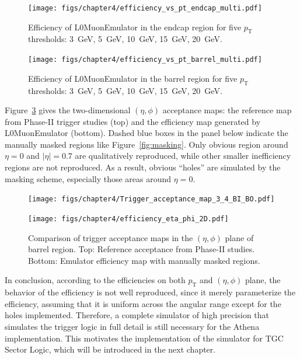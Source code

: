 \begin{figure}[htbp]
  \centering
  \texttt{[image: figs/chapter4/efficiency\_vs\_pt\_endcap\_multi.pdf]}
  \caption{Efficiency of L0MuonEmulator in the endcap region for five $p_\mathrm{T}$ thresholds: 3~GeV, 5~GeV, 10~GeV, 15~GeV, 20~GeV.}
  \label{fig:eff_pt_endcap}
\end{figure}

\begin{figure}[htbp]
  \centering
  \texttt{[image: figs/chapter4/efficiency\_vs\_pt\_barrel\_multi.pdf]}
  \caption{Efficiency of L0MuonEmulator in the barrel region for five $p_\mathrm{T}$ thresholds: 3~GeV, 5~GeV, 10~GeV, 15~GeV, 20~GeV.}
  \label{fig:eff_pt_barrel}
\end{figure}

Figure~\ref{fig:eta_phi_comparison} gives the two-dimensional $(\eta, \phi)$ acceptance maps: the reference map from Phase-II trigger studies (top) and the efficiency map generated by L0MuonEmulator (bottom). Dashed blue boxes in the panel below indicate the manually masked regions like Figure~\ref{fig:masking}. Only obvious region around $\eta = 0$ and $|\eta| = 0.7$ are qualitatively reproduced, while other smaller inefficiency regions are not reproduced. As a result, obvious ``holes'' are simulated by the masking scheme, especially those areas around $\eta = 0$.

\begin{figure}[htbp]
  \centering
  \texttt{[image: figs/chapter4/Trigger\_acceptance\_map\_3\_4\_BI\_BO.pdf]}
  \vspace{0.5em}
  
  \texttt{[image: figs/chapter4/efficiency\_eta\_phi\_2D.pdf]}
  
  \caption{Comparison of trigger acceptance maps in the $(\eta, \phi)$ plane of barrel region. Top: Reference acceptance from Phase-II studies. Bottom: Emulator efficiency map with manually masked regions.}
  \label{fig:eta_phi_comparison}
\end{figure}

In conclusion, according to the efficiencies on both $p_\mathrm{T}$ and $(\eta, \phi)$ plane, the behavior of the efficiency is not well reproduced, since it merely parameterize the efficiency, assuming that it is uniform across the angular range except for the holes implemented. Therefore, a complete simulator of high precision that simulates the trigger logic in full detail is still necessary for the Athena implementation. This motivates the implementation of the simulator for TGC Sector Logic, which will be introduced in the next chapter.
